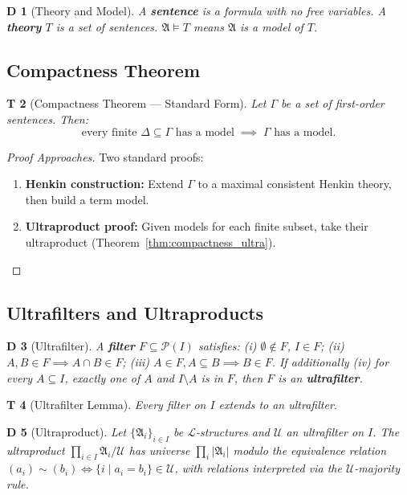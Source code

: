 \documentclass[12pt,a4paper]{article}
\newtheorem{theorem}Theorem[section]
\newtheorem{definition}[theorem]Definition
\theoremstyle{remark}
\newcommand{\Lang}{\mathcal{L}}
\newcommand{\Ultrafilter}{\mathcal{U}}
\newcommand{\Struct}{\mathfrak{A}}
\begin{document}
\begin{definition}[Theory and Model]
A \textbf{sentence} is a formula with no free variables. A \textbf{theory} \(T\) is a set of sentences. \(\Struct \models T\) means \(\Struct\) is a model of \(T\).
\end{definition}

\subsection{Compactness Theorem}
\begin{theorem}[Compactness Theorem --- Standard Form]
Let \(\Gamma\) be a set of first-order sentences. Then:
\begin{equation}
    \text{every finite } \Delta \subseteq \Gamma \text{ has a model}
    \;\implies\;
    \Gamma \text{ has a model}.
\end{equation}
\end{theorem}
\begin{proof}[Proof Approaches]
Two standard proofs:
\begin{enumerate}[label=(\arabic*),itemsep=2pt]
    \item \textbf{Henkin construction:} Extend \(\Gamma\) to a maximal consistent Henkin theory, then build a term model.
    \item \textbf{Ultraproduct proof:} Given models for each finite subset, take their ultraproduct (Theorem~\ref{thm:compactness_ultra}).
\end{enumerate}
\end{proof}

\subsection{Ultrafilters and Ultraproducts}
\begin{definition}[Ultrafilter]
A \textbf{filter} \(F \subseteq \mathcal{P}(I)\) satisfies: (i) \(\emptyset \notin F\), \(I \in F\); (ii) \(A, B \in F \implies A \cap B \in F\); (iii) \(A \in F, A \subseteq B \implies B \in F\). If additionally (iv) for every \(A \subseteq I\), exactly one of \(A\) and \(I \setminus A\) is in \(F\), then \(F\) is an \textbf{ultrafilter}.
\end{definition}

\begin{theorem}[Ultrafilter Lemma]
Every filter on \(I\) extends to an ultrafilter.
\end{theorem}

\begin{definition}[Ultraproduct]
Let \(\{\Struct_i\}_{i \in I}\) be \(\Lang\)-structures and \(\Ultrafilter\) an ultrafilter on \(I\). The ultraproduct \(\prod_{i \in I} \Struct_i / \Ultrafilter\) has universe \(\prod_i |\Struct_i|\) modulo the equivalence relation \((a_i) \sim (b_i) \iff \{i \mid a_i = b_i\} \in \Ultrafilter\), with relations interpreted via the \(\Ultrafilter\)-majority rule.
\end{definition}
\end{document}
